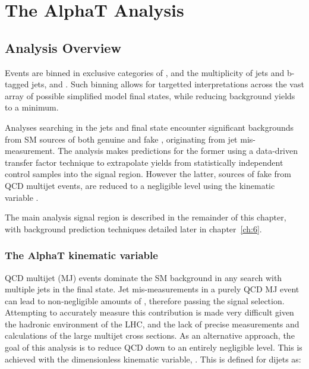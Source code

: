 \chapter{The AlphaT Analysis}
\label{ch:5}

\ifpdf
    \graphicspath{{Chapter5/Figs/Raster/}{Chapter5/Figs/PDF/}{Chapter5/Figs/}}
\else
    \graphicspath{{Chapter5/Figs/Vector/}{Chapter5/Figs/}}
\fi


\section{Analysis Overview}  %
\label{sec:selection_analysis_overview}

Events are binned in exclusive categories of \HT, 
and the multiplicity of jets and b-tagged jets,  
\nj and \nb. Such binning allows for targetted interpretations across
the vast array of
possible simplified model final states, while reducing background yields to a 
minimum.

Analyses searching in the jets and \met final state encounter significant 
backgrounds from SM sources of both genuine  
and fake \met, originating from jet mis-measurement. The \alphat 
analysis makes predictions for the former using a data-driven transfer factor 
technique to extrapolate yields from statistically independent control samples 
into the signal region. However the latter, sources of fake \met from QCD multijet events,
are reduced to a negligible level using the kinematic 
variable \alphat.

The main analysis signal region is described in the remainder of this chapter,
with background prediction techniques detailed later in chapter~\ref{ch:6}.


\subsection{The AlphaT kinematic variable}
\label{sec:alphat}

QCD multijet (MJ) events dominate the SM background in any search with multiple jets 
in the final state. Jet mis-measurements in a 
purely QCD MJ event can lead to non-negligible amounts of \mht, therefore 
passing the signal selection. Attempting
to accurately measure this contribution is
made very difficult given the hadronic environment of the LHC, and the lack of 
precise measurements and calculations of the large multijet cross sections. As an 
alternative approach, the goal of this analysis is to reduce QCD down to an
entirely negligible level. This is 
achieved with the dimensionless kinematic variable, \alphat [REF]. This is defined
for dijets as:

